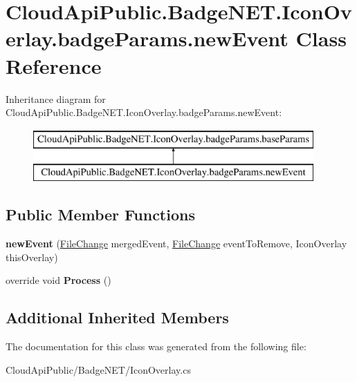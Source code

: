 \hypertarget{class_cloud_api_public_1_1_badge_n_e_t_1_1_icon_overlay_1_1badge_params_1_1new_event}{\section{Cloud\-Api\-Public.\-Badge\-N\-E\-T.\-Icon\-Overlay.\-badge\-Params.\-new\-Event Class Reference}
\label{class_cloud_api_public_1_1_badge_n_e_t_1_1_icon_overlay_1_1badge_params_1_1new_event}
}
Inheritance diagram for Cloud\-Api\-Public.\-Badge\-N\-E\-T.\-Icon\-Overlay.\-badge\-Params.\-new\-Event\-:\begin{figure}[H]
\begin{center}
\leavevmode
\includegraphics[height=2.000000cm]{class_cloud_api_public_1_1_badge_n_e_t_1_1_icon_overlay_1_1badge_params_1_1new_event}
\end{center}
\end{figure}
\subsection*{Public Member Functions}
\begin{DoxyCompactItemize}
\item 
\hypertarget{class_cloud_api_public_1_1_badge_n_e_t_1_1_icon_overlay_1_1badge_params_1_1new_event_ad7c4cc8e67d687ba85bbbba6dee272ae}{{\bfseries new\-Event} (\hyperlink{class_cloud_api_public_1_1_model_1_1_file_change}{File\-Change} merged\-Event, \hyperlink{class_cloud_api_public_1_1_model_1_1_file_change}{File\-Change} event\-To\-Remove, Icon\-Overlay this\-Overlay)}\label{class_cloud_api_public_1_1_badge_n_e_t_1_1_icon_overlay_1_1badge_params_1_1new_event_ad7c4cc8e67d687ba85bbbba6dee272ae}

\item 
\hypertarget{class_cloud_api_public_1_1_badge_n_e_t_1_1_icon_overlay_1_1badge_params_1_1new_event_af4f277b3f96ca7e5e8add4b0d208cb25}{override void {\bfseries Process} ()}\label{class_cloud_api_public_1_1_badge_n_e_t_1_1_icon_overlay_1_1badge_params_1_1new_event_af4f277b3f96ca7e5e8add4b0d208cb25}

\end{DoxyCompactItemize}
\subsection*{Additional Inherited Members}


The documentation for this class was generated from the following file\-:\begin{DoxyCompactItemize}
\item 
Cloud\-Api\-Public/\-Badge\-N\-E\-T/Icon\-Overlay.\-cs\end{DoxyCompactItemize}
